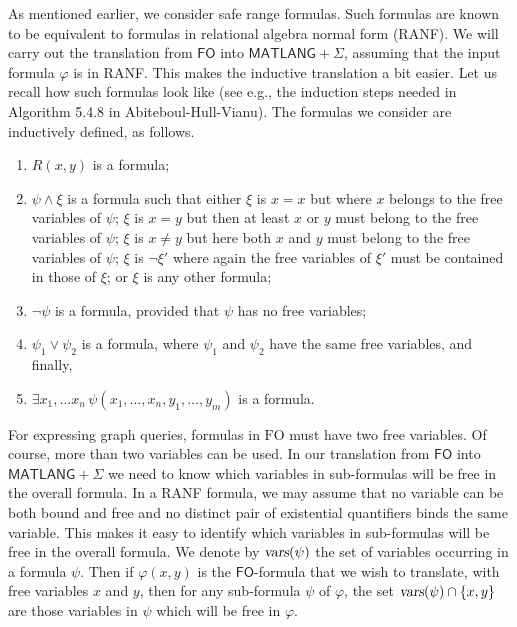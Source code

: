 As mentioned earlier, we consider safe range formulas. Such formulas are known to be equivalent to formulas in relational algebra normal form (RANF). We will carry out the translation from $\textsf{FO}$ into $\textsf{MATLANG}+\Sigma$, assuming that the input formula $\varphi$ is in RANF. This makes the inductive translation a bit easier. Let us recall how such formulas look like (see e.g., the induction steps needed in Algorithm 5.4.8 in Abiteboul-Hull-Vianu).
The formulas we consider are inductively defined, as follows.
\begin{enumerate}
\item $R(x,y)$ is a formula;
\item $\psi\land \xi$ is a formula such that either $\xi$ is $x=x$ but where $x$ belongs to the free variables of $\psi$; $\xi$ is $x=y$ but then at least $x$ or $y$ must belong to the free variables of $\psi$; $\xi$ is $x\neq y$ but here both $x$ and $y$ must belong to the free variables of $\psi$; $\xi$ is $\neg \xi'$ where  again the free variables of $\xi'$ must be contained in those of $\xi$; or $\xi$ is any other formula;
\item $\neg \psi$ is a formula, provided that $\psi$ has no free variables;
\item $\psi_1\vee \psi_2$ is a formula, where $\psi_1$ and $\psi_2$ have the same free variables, and finally,
\item $\exists x_1,\ldots x_n\, \psi(x_1,\ldots,x_n,y_1,\ldots,y_m)$ is a formula.
\end{enumerate}

For expressing graph queries, formulas in $\text{FO}$ must have two free variables. Of course, more than two variables can be used. In our translation from $\textsf{FO}$ into $\textsf{MATLANG}+\Sigma$ we need to know which variables in sub-formulas will be free in the overall formula. In a RANF formula, we may assume that no variable can be both bound and free and no distinct pair of existential quantifiers binds the same variable. This makes it easy to identify which variables in sub-formulas will be free in the overall formula. We denote by $\textsl{vars}(\psi)$ the set of variables occurring in a formula $\psi$. Then if $\varphi(x,y)$ is the  $\textsf{FO}$-formula that we wish to translate, with free variables $x$ and $y$, then for any sub-formula $\psi$ of $\varphi$, the set $\textsl{vars}(\psi)\cap \{x,y\}$ are those variables in $\psi$ which will be free in $\varphi$. 


